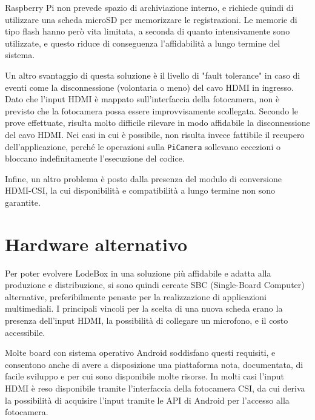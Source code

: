 Raspberry Pi non prevede spazio di archiviazione interno, e richiede quindi di utilizzare una scheda microSD per memorizzare le registrazioni. Le memorie di tipo flash hanno però vita limitata, a seconda di quanto intensivamente sono utilizzate, e questo riduce di conseguenza l'affidabilità a lungo termine del sistema.

Un altro svantaggio di questa soluzione è il livello di "fault tolerance" in caso di eventi come la disconnessione (volontaria o meno) del cavo HDMI in ingresso. Dato che l'input HDMI è mappato sull'interfaccia della fotocamera, non è previsto che la fotocamera possa essere improvvisamente scollegata. Secondo le prove effettuate, risulta molto difficile rilevare in modo affidabile la disconnessione del cavo HDMI. Nei casi in cui è possibile, non risulta invece fattibile il recupero dell'applicazione, perché le operazioni sulla \texttt{PiCamera} sollevano eccezioni o bloccano indefinitamente l'esecuzione del codice.

Infine, un altro problema è posto dalla presenza del modulo di conversione HDMI-CSI, la cui disponibilità e compatibilità a lungo termine non sono garantite.

\section{Hardware alternativo}
\label{sec:intro_hardware}

Per poter evolvere LodeBox in una soluzione più affidabile e adatta alla produzione e distribuzione, si sono quindi cercate SBC (Single-Board Computer) alternative, preferibilmente pensate per la realizzazione di applicazioni multimediali. I principali vincoli per la scelta di una nuova scheda erano la presenza dell'input HDMI, la possibilità di collegare un microfono, e il costo accessibile.

Molte board con sistema operativo Android soddisfano questi requisiti, e consentono anche di avere a disposizione una piattaforma nota, documentata, di facile sviluppo e per cui sono disponibile molte risorse. In molti casi l'input HDMI è reso disponibile tramite l'interfaccia della fotocamera CSI, da cui deriva la possibilità di acquisire l'input tramite le API di Android per l'accesso alla fotocamera.

